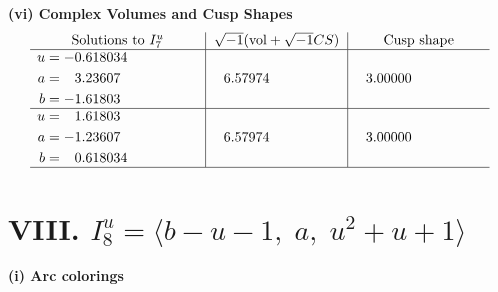 \documentclass[1p]{elsarticle_modified}
\theoremstyle{definition}
\newcommand{\I}{\sqrt{-1}}
\begin{document}
\newpage\flushleft \textbf{(vi) Complex Volumes and Cusp Shapes}
$$\begin{array}{c|c|c}  
\text{Solutions to }I^u_{7}& \I (\text{vol} + \sqrt{-1}CS) & \text{Cusp shape}\\
 \hline 
\begin{aligned}
u &= -0.618034\phantom{ +0.000000I} \\
a &= \phantom{-}3.23607\phantom{ +0.000000I} \\
b &= -1.61803\phantom{ +0.000000I}\end{aligned}
 & \phantom{-}6.57974\phantom{ +0.000000I} & \phantom{-}3.00000\phantom{ +0.000000I} \\ \hline\begin{aligned}
u &= \phantom{-}1.61803\phantom{ +0.000000I} \\
a &= -1.23607\phantom{ +0.000000I} \\
b &= \phantom{-}0.618034\phantom{ +0.000000I}\end{aligned}
 & \phantom{-}6.57974\phantom{ +0.000000I} & \phantom{-}3.00000\phantom{ +0.000000I}\\
 \hline 
 \end{array}$$\newpage\newpage\renewcommand{\arraystretch}{1}
\centering \section*{VIII. $I^u_{8}= \langle b- u-1,\;a,\;u^2+u+1 \rangle$}
\flushleft \textbf{(i) Arc colorings}\\
\end{document}
